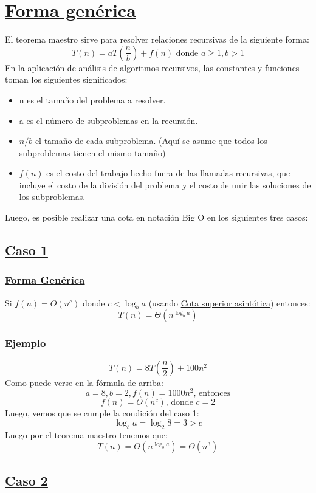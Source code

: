 \documentclass{article}
\begin{document}
	\section[Forma genérica]{\hyperlink{toc}{Forma genérica}}
	\noindent
	El teorema maestro sirve para resolver relaciones recursivas de la siguiente forma: 
	\[T(n)=aT\left(\frac{n}{b}\right)+f(n) \textrm{ donde } a\geq1,b>1\]
	En la aplicación de análisis de algoritmos recursivos, las constantes y funciones toman los siguientes significados:
	\begin{itemize}[label={$\bullet$}]
		\item n es el tamaño del problema a resolver.
		\item a es el número de subproblemas en la recursión.
		\item $n/b$ el tamaño de cada subproblema. (Aquí se asume que todos los subproblemas tienen el mismo tamaño)
		\item $f(n)$ es el costo del trabajo hecho fuera de las llamadas recursivas, que incluye el costo de la división del problema y el costo de unir las soluciones de los subproblemas.
	\end{itemize}
	\noindent
	Luego, es posible realizar una cota en notación Big O en los siguientes tres casos: 
		\subsection[Caso 1]{\hyperlink{toc}{Caso 1}}
			\subsubsection[Forma Genérica]{\hyperlink{toc}{Forma Genérica}}
			\noindent
			Si $f(n)=O(n^{c})$ donde $c<\log_{b}a$ (usando \href{https://es.wikipedia.org/wiki/Cota_superior_asintótica}{Cota superior asintótica})
			entonces:
			\[T(n)=\Theta(n^{\log_{b}a})\]
			\subsubsection[Ejemplo]{\hyperlink{toc}{Ejemplo}}
			\[T(n)=8T\left(\frac{n}{2}\right)+100n^{2}\]
			Como puede verse en la fórmula de arriba: 
			\[a=8, b=2, f(n)=1000n^{2}\textrm{, entonces}\]
			\[f(n)=O(n^{c})\textrm{, donde } c=2\]
			Luego, vemos que se cumple la condición del caso 1: 
			\[\log_{b}a=\log_{2}8=3>c\]
			Luego por el teorema maestro tenemos que:
			\[T(n)=\Theta(n^{\log_{b}a})=\Theta(n^{3})\]
		\subsection[Caso 2]{\hyperlink{toc}{Caso 2}}
\end{document}
